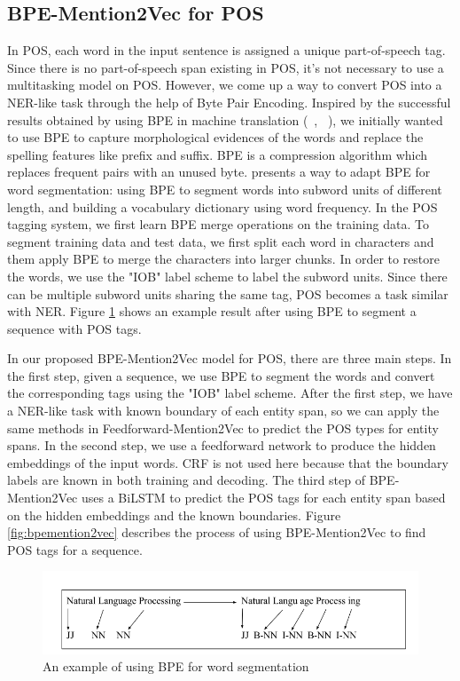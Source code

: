 \subsection{BPE-Mention2Vec for POS}
In POS, each word in the input sentence is assigned a unique part-of-speech tag. Since there is no part-of-speech span existing in POS, it's not necessary to use a multitasking model on POS. However, we come up a way to convert POS into a NER-like task through the help of Byte Pair Encoding. Inspired by the successful results obtained by using BPE in machine translation (~\citeauthor{sennrich2015neural}, ~\citeyear{sennrich2015neural}), we initially wanted to use BPE to capture morphological evidences of the words and replace the spelling features like prefix and suffix. BPE is a compression algorithm which replaces frequent pairs with an unused byte. \cite{sennrich2015neural} presents a way to adapt BPE for word segmentation: using BPE to segment words into subword units of different length, and building a vocabulary dictionary using word frequency. In the POS tagging system, we first learn BPE merge operations on the training data. To segment training data and test data, we first split each word in characters and them apply BPE to merge the characters into larger chunks. In order to restore the words, we use the "IOB" label scheme to label the subword units. Since there can be multiple subword units sharing the same tag, POS becomes a task similar with NER. Figure \ref{fig:bpe} shows an example result after using BPE to segment a sequence with POS tags. 

In our proposed BPE-Mention2Vec model for POS, there are three main steps. In the first step, given a sequence, we use BPE to segment the words and convert the corresponding tags using the "IOB" label scheme. After the first step, we have a NER-like task with known boundary of each entity span, so we can apply the same methods in Feedforward-Mention2Vec to predict the POS types for entity spans. In the second step, we use a feedforward network to produce the hidden embeddings of the input words. CRF is not used here because that the boundary labels are known in both training and decoding. The third step of BPE-Mention2Vec uses a BiLSTM to predict the POS tags for each entity span based on the hidden embeddings and the known boundaries. Figure \ref{fig:bpemention2vec} describes the process of using BPE-Mention2Vec to find POS tags for a sequence. 


\begin{figure}
  \centering
  \includegraphics[scale=0.5]{bpe.png}
 \caption{An example of using BPE for word segmentation}
  \label{fig:bpe}
\end{figure}

